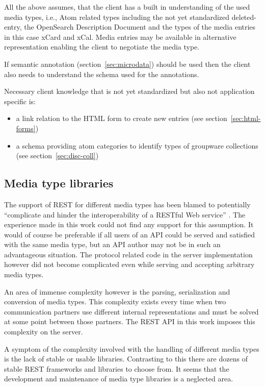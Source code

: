 \documentclass[11pt,a4paper,headsepline,twoside]{scrartcl}		%
\begin{document}
All the above assumes, that the client has a built in understanding of the used
media types, i.e., Atom related types including the not yet standardized
deleted-entry, the OpenSearch Description Document and the types of the media
entries in this case xCard and xCal. Media entries may be available in
alternative representation enabling the client to negotiate the media type.

If semantic annotation (section~\ref{sec:microdata}) should be used then the
client also needs to understand the schema used for the annotations.

Necessary client knowledge that is not yet standardized but also not application
specific is:

\begin{itemize}
\item a link relation to the HTML form to create new entries (see
  section~\ref{sec:html-forms})
\item a schema providing atom categories to identify types of groupware
  collections (see section~\ref{sec:disc-coll})
\end{itemize}

\subsection{Media type libraries}
\label{sec:mediatype-libraries}

The support of REST for different media types has been blamed to potentially
``complicate and hinder the interoperability of a RESTful Web
service'' \cite[sec. 7.2]{Pautasso2008}. The experience made
in this work could not find any support for this assumption. It would of course
be preferable if all users of an API could be served and satisfied with the
same media type, but an API author may not be in such an advantageous
situation. The protocol related code in the server implementation however did
not become complicated even while serving and accepting arbitrary media types.

An area of immense complexity however is the parsing, serialization and
conversion of media types. This complexity exists every time when two
communication partners use different internal representations and must be solved
at some point between those partners. The REST API in this work imposes this
complexity on the server.

A symptom of the complexity involved with the handling of different media types
is the lack of stable or usable libraries. Contrasting to this there are dozens
of stable REST frameworks and libraries to choose from. It seems that the
development and maintenance of media type libraries is a neglected area.
\end{document}
